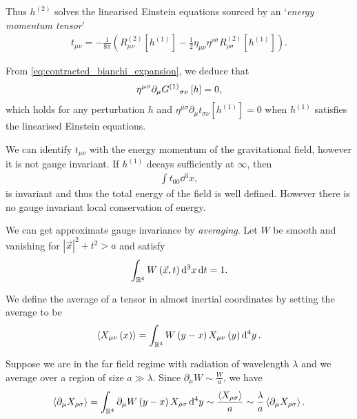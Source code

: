 Thus $h^{\left( 2 \right) }$ solves the linearised Einstein equations sourced by an `\textit{energy momentum tensor}'
\begin{align}
    t_{\mu \nu} = -\frac{1}{8\pi} \left( R^{\left( 2 \right) }_{\mu \nu}\left[ h^{\left( 1 \right) } \right]  - \frac{1}{2} \eta_{\mu \nu}\eta^{\rho \sigma} R^{\left( 2 \right) }_{\rho \sigma} \left[ h^{\left( 1 \right) } \right] \right)   
.\end{align}

From \cref{eq:contracted_bianchi_expansion}, we deduce that
\begin{align}
    \eta^{\mu \sigma} \partial_\mu \tensor{G}{^{\left( 1 \right) }}_{\sigma \nu} \left[ h \right] = 0
,\end{align}
which holds for any perturbation $h$ and $\eta^{\mu \sigma} \partial_\mu t_{\sigma \nu} \left[ h^{\left( 1 \right) } \right] = 0$ when $h^{\left( 1 \right) }$ satisfies the linearised Einstein equations.

We can identify $t_{\mu \nu}$ with the energy momentum of the gravitational field, however it is not gauge invariant. If $h^{\left( 1 \right) }$ decays sufficiently at $\infty$, then
\begin{align}
    \int t_{00} \dd{^3x}
,\end{align}
is invariant and thus the total energy of the field is well defined. However there is no gauge invariant local conservation of energy.

We can get approximate gauge invariance by  \textit{averaging}. Let $W$ be smooth and vanishing for $\left| \vec{x} \right|^2 + t^2 > a$ and satisfy
\begin{align}
    \int_{\mathbb{R}^{4}} W\left( \vec{x},t \right) \dd{^3x} \dd{t} = 1
.\end{align}

We define the average of a tensor in almost inertial coordinates by setting the average to be
\begin{align}
    \left<X_{\mu \nu}\left( x \right)  \right> = \int_{\mathbb{R}^{4}} W \left( y - x \right) X_{\mu \nu}\left( y \right) \dd{^{4}y}
.\end{align}

Suppose we are in the far field regime with radiation of wavelength $\lambda$ and we average over a region of size $a \gg \lambda$. Since $\partial_\mu W \sim  \frac{W}{a}$, we have
\begin{align}
    \left<\partial_\mu X_{\rho \sigma} \right> = \int_{\mathbb{R}^{4}} \partial_\mu W\left( y - x \right) X_{\rho \sigma} \dd{^{4}y} \sim  \frac{\left<X_{\rho \sigma} \right>}{a} \sim  \frac{\lambda}{a} \left<\partial_\mu X_{\rho \sigma} \right>
.\end{align}


